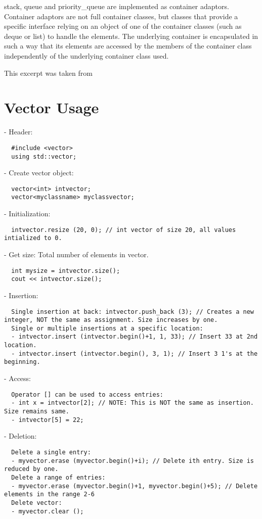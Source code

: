 \documentclass[12pt,a4paper]{article}
\begin{document}
stack, queue and priority\_queue are implemented as container adaptors.
Container adaptors are not full container classes, but classes that provide a specific interface relying
on an object of one of the container classes (such as deque or list) to handle the elements.
The underlying container is encapsulated in such a way that its elements are accessed by the members of the
container class independently of the underlying container class used.

This excerpt was taken from \cite{Ref:CPP-STL}

\section{Vector Usage}
- Header:
\begin{verbatim}
  #include <vector>
  using std::vector;
\end{verbatim}
- Create vector object:
\begin{verbatim}
  vector<int> intvector;
  vector<myclassname> myclassvector;
\end{verbatim}
- Initialization:
\begin{verbatim}
  intvector.resize (20, 0); // int vector of size 20, all values intialized to 0.
\end{verbatim}
- Get size: Total number of elements in vector.
\begin{verbatim}
  int mysize = intvector.size();
  cout << intvector.size(); 
\end{verbatim}
- Insertion:
\begin{verbatim}
  Single insertion at back: intvector.push_back (3); // Creates a new integer, NOT the same as assignment. Size increases by one.
  Single or multiple insertions at a specific location:
  - intvector.insert (intvector.begin()+1, 1, 33); // Insert 33 at 2nd location.
  - intvector.insert (intvector.begin(), 3, 1); // Insert 3 1's at the beginning.
\end{verbatim}
- Access:
\begin{verbatim}
  Operator [] can be used to access entries:
  - int x = intvector[2]; // NOTE: This is NOT the same as insertion. Size remains same.
  - intvector[5] = 22;
\end{verbatim}
- Deletion:
\begin{verbatim}
  Delete a single entry: 
  - myvector.erase (myvector.begin()+i); // Delete ith entry. Size is reduced by one.
  Delete a range of entries: 
  - myvector.erase (myvector.begin()+1, myvector.begin()+5); // Delete elements in the range 2-6
  Delete vector:
  - myvector.clear ();
\end{verbatim}
\end{document}
